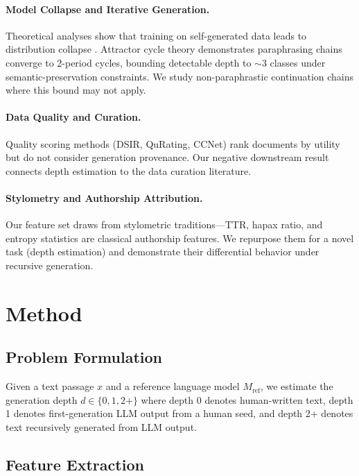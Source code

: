 \documentclass[11pt,a4paper]{article}
\begin{document}
\paragraph{Model Collapse and Iterative Generation.}
Theoretical analyses show that training on self-generated data leads to distribution collapse \cite{shumailov2024model}.
Attractor cycle theory demonstrates paraphrasing chains converge to 2-period cycles, bounding detectable depth to $\sim$3 classes under semantic-preservation constraints.
We study non-paraphrastic continuation chains where this bound may not apply.

\paragraph{Data Quality and Curation.}
Quality scoring methods (DSIR, QuRating, CCNet) rank documents by utility but do not consider generation provenance.
Our negative downstream result connects depth estimation to the data curation literature.

\paragraph{Stylometry and Authorship Attribution.}
Our feature set draws from stylometric traditions---TTR, hapax ratio, and entropy statistics are classical authorship features.
We repurpose them for a novel task (depth estimation) and demonstrate their differential behavior under recursive generation.

\section{Method}

\subsection{Problem Formulation}

Given a text passage $x$ and a reference language model $M_{\text{ref}}$, we estimate the generation depth $d \in \{0, 1, 2+\}$ where depth 0 denotes human-written text, depth 1 denotes first-generation LLM output from a human seed, and depth 2+ denotes text recursively generated from LLM output.

\subsection{Feature Extraction}
\end{document}

